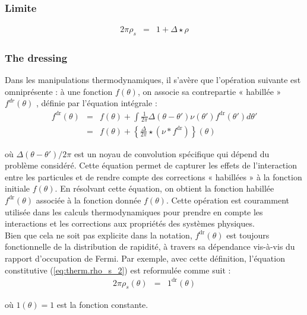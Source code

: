 \subsubsection{Limite}

\begin{eqnarray*}
	2\pi \rho_s & = & 1 + \Delta \star \rho 
\end{eqnarray*}

\subsubsection{The dressing}

Dans les manipulations thermodynamiques, il s'avère que l'opération suivante est omniprésente : à une fonction $f(\theta)$, on associe sa contrepartie « habillée » $f^{dr}(\theta)$
, définie par l'équation intégrale :
\begin{eqnarray}
	f^{\mathrm{dr}}(\theta) & = & f(\theta) + \int \frac{1}{2\pi} \Delta( \theta - \theta' ) \nu ( \theta' ) f^{\mathrm{dr}}(\theta') d \theta ' \\
	& = & 	f(\theta) + \left \{ \frac{\Delta}{2\pi} \star (\nu \ast f^{\mathrm{dr}}) \right \} ( \theta ) 		
\end{eqnarray}


où $\Delta ( \theta - \theta' )/2\pi$ est un noyau de convolution spécifique qui dépend du problème considéré. Cette équation permet de capturer les effets de l'interaction entre les particules et de rendre compte des corrections « habillées » à la fonction initiale $f(\theta)$. En résolvant cette équation, on obtient la fonction habillée $f^{\mathrm{dr}}(\theta)$ associée à la fonction donnée $f(\theta)$. Cette opération est couramment utilisée dans les calculs thermodynamiques pour prendre en compte les interactions et les corrections aux propriétés des systèmes physiques.\\


Bien que cela ne soit pas explicite dans la notation, $f^{\mathrm{dr}}(\theta)$ est toujours fonctionnelle de la distribution de rapidité, à travers sa dépendance vis-à-vis du rapport d'occupation de Fermi. Par exemple, avec cette définition, l'équation constitutive (\ref{eq:therm.rho_s_2}) est reformulée comme suit :
\begin{eqnarray}
	2\pi \rho_s ( \theta ) & = & \mathrm{1}^{\mathrm{dr}}(\theta)		
\end{eqnarray}

où $\mathrm{1}(\theta) = 1$ est la fonction constante.
